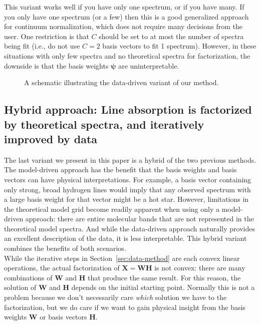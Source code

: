 \documentclass[modern]{aastex631}
\renewcommand{\vec}[1]{\mathbf{#1}}
\newcommand{\vecpsi}{\boldsymbol{\psi}}
\newcommand{\vecW}{\mathbf{W}}
\newcommand{\vecH}{\mathbf{H}}
\begin{document}
This variant works well if you have only one spectrum, or if you have many. If you only have one spectrum (or a few) then this is a good generalized approach for continuum normalization, which does not require many decisions from the user. One restriction is that $C$ should be set to at most the number of spectra being fit (i.e., do not use $C = 2$ basis vectors to fit 1 spectrum). However, in these situations with only few spectra and no theoretical spectra for factorization, the downside is that the basis weights $\vecpsi$ are uninterpretable.

\begin{figure*}
    \caption{A schematic illustrating the data-driven variant of our method.\label{fig:schematic-data-driven}}
\end{figure*}


\subsection{Hybrid approach: Line absorption is factorized by theoretical spectra, and iteratively improved by data}
\label{sec:hybrid-method}

The last variant we present in this paper is a hybrid of the two previous methods. The model-driven approach has the benefit that the basis weights and basis vectors can have physical interpretations. For example, a basis vector containing only strong, broad hydrogen lines would imply that any observed spectrum with a large basis weight for that vector might be a hot star. However, limitations in the theoretical model grid become readily apparent when using only a model-driven approach: there are entire molecular bands that are not represented in the theoretical model spectra. And while the data-driven approach naturally provides an excellent description of the data, it is less interpretable. This hybrid variant combines the benefits of both scenarios. \\

While the iterative steps in Section~\ref{sec:data-method} are each convex linear operations, the actual factorization of $\vec{X} = \vec{WH}$ is not convex: there are many combinations of $\vecW$ and $\vecH$ that produce the same result. For this reason, the solution of $\vecW$ and $\vecH$ depends on the initial starting point. Normally this is not a problem because we don't necessarily care \emph{which} solution we have to the factorization, but we do care if we want to gain physical insight from the basis weights $\vecW$ or basis vectors $\vecH$.\\
\end{document}
